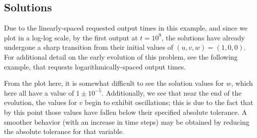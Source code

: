 \documentclass[letterpaper,10pt,english]{sphinxmanual}
\begin{document}
\subsection{Solutions}
\label{c_serial:id14}
Due to the linearly-spaced requested output times in this example, and
since we plot in a log-log scale, by the first output at
\(t=10^9\), the solutions have already undergone a sharp
transition from their initial values of \((u,v,w) = (1, 0, 0)\).
For additional detail on the early evolution of this problem, see the
following example, that requests logarithmically-spaced output times.

From the plot here, it is somewhat difficult to see the solution
values for \(w\), which here all have a value of
\(1 \pm 10^{-5}\).  Additionally, we see that near the end of the
evolution, the values for \(v\) begin to exhibit oscillations;
this is due to the fact that by this point those values have fallen
below their specified absolute tolerance.  A smoother behavior (with
an increase in time steps) may be obtained by reducing the absolute
tolerance for that variable.
\begin{figure}[htbp]
\centering

\end{figure}
\end{document}

